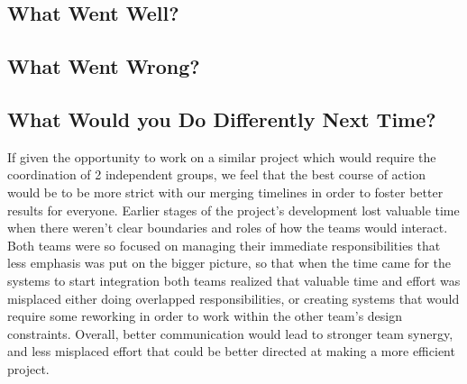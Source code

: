 \documentclass{article}
\begin{document}
\subsection{What Went Well?}


\subsection{What Went Wrong?}


\subsection{What Would you Do Differently Next Time?}

If given the opportunity to work on a similar project which would require the coordination of 2 independent groups, we feel that the best course of action would be to be more strict with our merging timelines in order to foster better results for everyone. Earlier stages of the project's development lost valuable time when there weren't clear boundaries and roles of how the teams would interact. Both teams were so focused on managing their immediate responsibilities that less emphasis was put on the bigger picture, so that when the time came for the systems to start integration both teams realized that valuable time and effort was misplaced either doing overlapped responsibilities, or creating systems that would require some reworking in order to work within the other team's design constraints. Overall, better communication would lead to stronger team synergy, and less misplaced effort that could be better directed at making a more efficient project. 
\end{document}

